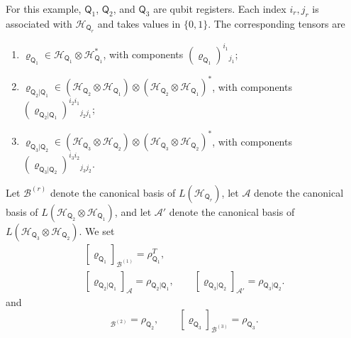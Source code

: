 \documentclass[
    aps,
    pra,
    reprint,
    superscriptaddress,
    nofootinbib
]{revtex4-2}
\theoremstyle{definition}
\theoremstyle{plain}
\begin{document}
For this example, $\mathsf{Q}_{1}$, $\mathsf{Q}_{2}$, and
$\mathsf{Q}_{3}$ are qubit registers. Each index $i_{r},j_{r}$ is associated
with $\mathcal{H}_{\mathsf{Q}_{r}}$ and takes values in $\{0,1\}$. The
corresponding tensors are
\begin{enumerate}
    \item
    $\varrho_{\mathsf{Q}_{1}}
    \in
    \mathcal{H}_{\mathsf{Q}_{1}}
    \otimes
    \mathcal{H}_{\mathsf{Q}_{1}}^{*}$, with components
    $(\varrho_{\mathsf{Q}_{1}})^{i_{1}}{}_{j_{1}}$;

    \item
    $\varrho_{\mathsf{Q}_{2}|\mathsf{Q}_{1}}
    \in
    (\mathcal{H}_{\mathsf{Q}_{2}}
    \otimes\mathcal{H}_{\mathsf{Q}_{1}})
    \otimes
    (\mathcal{H}_{\mathsf{Q}_{2}}
    \otimes\mathcal{H}_{\mathsf{Q}_{1}})^{*}$, with components
    $(\varrho_{\mathsf{Q}_{2}|\mathsf{Q}_{1}})
    ^{i_{2}i_{1}}{}_{j_{2}j_{1}}$;

    \item
    $\varrho_{\mathsf{Q}_{3}|\mathsf{Q}_{2}}
    \in
    (\mathcal{H}_{\mathsf{Q}_{3}}
    \otimes\mathcal{H}_{\mathsf{Q}_{2}})
    \otimes
    (\mathcal{H}_{\mathsf{Q}_{3}}
    \otimes\mathcal{H}_{\mathsf{Q}_{2}})^{*}$, with components
    $(\varrho_{\mathsf{Q}_{3}|\mathsf{Q}_{2}})
    ^{i_{3}i_{2}}{}_{j_{3}j_{2}}$.
\end{enumerate}
Let $\mathcal{B}^{(r)}$ denote the canonical basis of
$L(\mathcal{H}_{\mathsf{Q}_{r}})$, let $\mathcal{A}$ denote the
canonical basis of
$L(\mathcal{H}_{\mathsf{Q}_{2}}\otimes
\mathcal{H}_{\mathsf{Q}_{1}})$, and let $\mathcal{A}'$ denote the
canonical basis of
$L(\mathcal{H}_{\mathsf{Q}_{3}}\otimes
\mathcal{H}_{\mathsf{Q}_{2}})$. We set
\begin{equation}
    \begin{gathered}
    [\varrho_{\mathsf{Q}_{1}}]_{\mathcal{B}^{(1)}}
    =
    \rho_{\mathsf{Q}_{1}}^{T},\\
    [\varrho_{\mathsf{Q}_{2}|\mathsf{Q}_{1}}]_{\mathcal{A}}
    =
    \rho_{\mathsf{Q}_{2}|\mathsf{Q}_{1}},
    \qquad
    [\varrho_{\mathsf{Q}_{3}|\mathsf{Q}_{2}}]_{\mathcal{A}'}
    =
    \rho_{\mathsf{Q}_{3}|\mathsf{Q}_{2}}.
    \end{gathered}
\end{equation}
and
\begin{equation}
    [\varrho_{\mathsf{Q}_{2}}]_{\mathcal{B}^{(2)}}
    =
    \rho_{\mathsf{Q}_{2}},
    \qquad
    [\varrho_{\mathsf{Q}_{3}}]_{\mathcal{B}^{(3)}}
    =
    \rho_{\mathsf{Q}_{3}}.
    \label{eq:teq1}
\end{equation}
\end{document}
